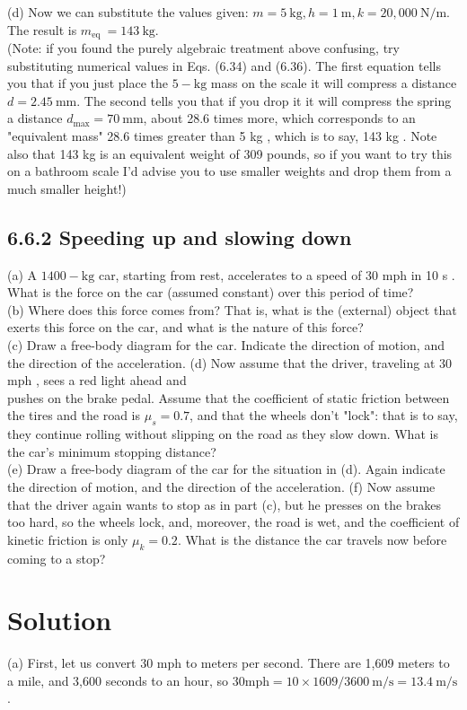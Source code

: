 \documentclass[10pt]{article}
\begin{document}
(d) Now we can substitute the values given: $m=5 \mathrm{~kg}, h=1 \mathrm{~m}, k=20,000 \mathrm{~N} / \mathrm{m}$. The result is $m_{\text {eq }}=143 \mathrm{~kg}$.\\
(Note: if you found the purely algebraic treatment above confusing, try substituting numerical values in Eqs. (6.34) and (6.36). The first equation tells you that if you just place the $5-\mathrm{kg}$ mass on the scale it will compress a distance $d=2.45 \mathrm{~mm}$. The second tells you that if you drop it it will compress the spring a distance $d_{\max }=70 \mathrm{~mm}$, about 28.6 times more, which corresponds to an "equivalent mass" 28.6 times greater than 5 kg , which is to say, 143 kg . Note also that 143 kg is an equivalent weight of 309 pounds, so if you want to try this on a bathroom scale I'd advise you to use smaller weights and drop them from a much smaller height!)

\subsection*{6.6.2 Speeding up and slowing down}
(a) A $1400-\mathrm{kg}$ car, starting from rest, accelerates to a speed of 30 mph in 10 s . What is the force on the car (assumed constant) over this period of time?\\
(b) Where does this force comes from? That is, what is the (external) object that exerts this force on the car, and what is the nature of this force?\\
(c) Draw a free-body diagram for the car. Indicate the direction of motion, and the direction of the acceleration. (d) Now assume that the driver, traveling at 30 mph , sees a red light ahead and\\
pushes on the brake pedal. Assume that the coefficient of static friction between the tires and the road is $\mu_{s}=0.7$, and that the wheels don't "lock": that is to say, they continue rolling without slipping on the road as they slow down. What is the car's minimum stopping distance?\\
(e) Draw a free-body diagram of the car for the situation in (d). Again indicate the direction of motion, and the direction of the acceleration. (f) Now assume that the driver again wants to stop as in part (c), but he presses on the brakes too hard, so the wheels lock, and, moreover, the road is wet, and the coefficient of kinetic friction is only $\mu_{k}=0.2$. What is the distance the car travels now before coming to a stop?

\section*{Solution}
(a) First, let us convert 30 mph to meters per second. There are 1,609 meters to a mile, and 3,600 seconds to an hour, so $30 \mathrm{mph}=10 \times 1609 / 3600 \mathrm{~m} / \mathrm{s}=13.4 \mathrm{~m} / \mathrm{s}$.
\end{document}
